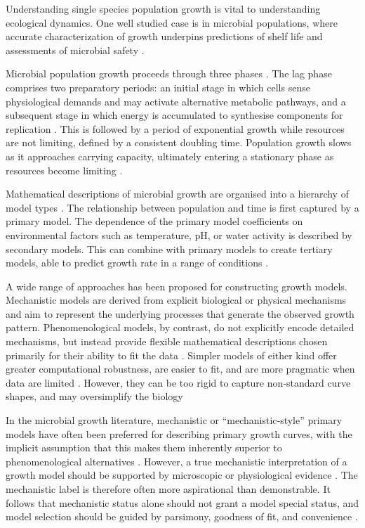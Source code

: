 \documentclass[11pt]{article}
\begin{document}
Understanding single species population growth is vital to understanding ecological dynamics. 
One well studied case is in microbial populations, where accurate characterization of growth 
underpins predictions of shelf life and assessments of microbial safety
\citep{zwietering1990modeling}. 

Microbial population growth proceeds through three phases \citep{buchanan1997simple}. 
The lag phase comprises
two preparatory periods: an initial stage in which cells sense physiological demands and may
activate alternative metabolic pathways, and a subsequent stage in which energy is accumulated
to synthesise components for replication \citep{buchanan1997simple}. This is followed
by a period of exponential growth while resources are not limiting, defined by a consistent 
doubling time. Population growth slows as it approaches carrying capacity, 
ultimately entering a stationary phase as resources become limiting \citep{zwietering1990modeling}. 

Mathematical descriptions of microbial growth are organised into a hierarchy of model
types \citep{peleg2011microbial}. The relationship between population and time is first 
captured by a primary model. The dependence of the primary model coefficients on 
environmental factors such as temperature, pH, or water activity is described by
secondary models. This can combine with primary models to create tertiary 
models, able to predict growth rate in a range of conditions \citep{peleg2011microbial}. 

A wide range of approaches has been proposed for constructing growth models. Mechanistic 
models are derived from explicit biological or physical mechanisms and aim to represent the 
underlying processes that generate the observed growth pattern. Phenomenological models, by 
contrast, do not explicitly encode detailed mechanisms, but instead provide flexible 
mathematical descriptions chosen primarily for their ability to fit the data \citep{peleg2011microbial}. Simpler models of either kind offer greater computational robustness, are easier to fit, and are more pragmatic when data are limited \citep{buchanan1997simple, 
peleg2011microbial}. However, they can be too rigid to capture 
non‑standard curve shapes, and may oversimplify the biology \citep{baranyi1997simple, peleg2011microbial, buchanan1997simple}

 In the microbial growth literature, mechanistic or “mechanistic‑style” primary models have often 
 been preferred for describing primary growth curves, with the implicit 
 assumption that this makes them inherently superior to phenomenological alternatives 
 \citep{baranyi1995mathematics,peleg2011microbial}. However, a 
 true mechanistic interpretation of a growth model should be supported by microscopic or 
 physiological evidence \citep{peleg2011microbial}. The mechanistic label is therefore often more aspirational than 
 demonstrable. It follows that mechanistic status alone should not grant a model special 
 status, and model selection should be guided by parsimony, goodness of fit, and 
 convenience \citep{peleg2011microbial}.
 
\end{document}
